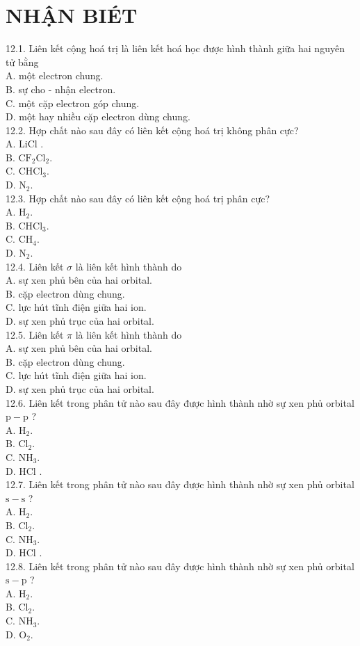 \documentclass[10pt]{article}
\begin{document}
\section*{NHẬN BIÉT}
12.1. Liên kết cộng hoá trị là liên kết hoá học được hình thành giữa hai nguyên tử bằng\\
A. một electron chung.\\
B. sự cho - nhận electron.\\
C. một cặp electron góp chung.\\
D. một hay nhiều cặp electron dùng chung.\\
12.2. Hợp chất nào sau đây có liên kết cộng hoá trị không phân cực?\\
A. LiCl .\\
B. $\mathrm{CF}_{2} \mathrm{Cl}_{2}$.\\
C. $\mathrm{CHCl}_{3}$.\\
D. $\mathrm{N}_{2}$.\\
12.3. Hợp chất nào sau đây có liên kết cộng hoá trị phân cực?\\
A. $\mathrm{H}_{2}$.\\
B. $\mathrm{CHCl}_{3}$.\\
C. $\mathrm{CH}_{4}$.\\
D. $\mathrm{N}_{2}$.\\
12.4. Liên kết $\sigma$ là liên kết hình thành do\\
A. sự xen phủ bên của hai orbital.\\
B. cặp electron dùng chung.\\
C. lực hút tĩnh điện giữa hai ion.\\
D. sự xen phủ trục của hai orbital.\\
12.5. Liên kết $\pi$ là liên kết hình thành do\\
A. sự xen phủ bên của hai orbital.\\
B. cặp electron dùng chung.\\
C. lực hút tĩnh điện giữa hai ion.\\
D. sự xen phủ trục của hai orbital.\\
12.6. Liên kết trong phân tử nào sau đây được hình thành nhờ sự xen phủ orbital $\mathrm{p}-\mathrm{p}$ ?\\
A. $\mathrm{H}_{2}$.\\
B. $\mathrm{Cl}_{2}$.\\
C. $\mathrm{NH}_{3}$.\\
D. HCl .\\
12.7. Liên kết trong phân tử nào sau đây được hình thành nhờ sự xen phủ orbital $\mathrm{s}-\mathrm{s}$ ?\\
A. $\mathrm{H}_{2}$.\\
B. $\mathrm{Cl}_{2}$.\\
C. $\mathrm{NH}_{3}$.\\
D. HCl .\\
12.8. Liên kết trong phân tử nào sau đây được hình thành nhờ sự xen phủ orbital $\mathrm{s}-\mathrm{p}$ ?\\
A. $\mathrm{H}_{2}$.\\
B. $\mathrm{Cl}_{2}$.\\
C. $\mathrm{NH}_{3}$.\\
D. $\mathrm{O}_{2}$.
\end{document}
